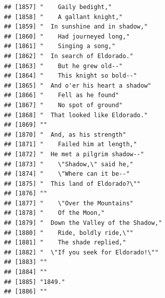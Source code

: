 \documentclass{article}\usepackage[]{graphicx}\usepackage[]{color}
\makeatletter
\newenvironment{kframe}{%
 \def\at@end@of@kframe{}%
 \ifinner\ifhmode%
  \def\at@end@of@kframe{\end{minipage}}%
  \begin{minipage}{\columnwidth}%
 \fi\fi%
 \def\FrameCommand##1{\hskip\@totalleftmargin \hskip-\fboxsep
 \colorbox{shadecolor}{##1}\hskip-\fboxsep
     \hskip-\linewidth \hskip-\@totalleftmargin \hskip\columnwidth}%
 \MakeFramed {\advance\hsize-\width
   \@totalleftmargin\z@ \linewidth\hsize
   \@setminipage}}%
 {\par\unskip\endMakeFramed%
 \at@end@of@kframe}
\newenvironment{knitrout}{}{} %
\makeatother
\begin{document}
\begin{knitrout}
\begin{kframe}
\begin{verbatim}
## [1857] "    Gaily bedight,"                                                          
## [1858] "    A gallant knight,"                                                       
## [1859] "  In sunshine and in shadow,"                                                
## [1860] "    Had journeyed long,"                                                     
## [1861] "    Singing a song,"                                                         
## [1862] "  In search of Eldorado."                                                    
## [1863] "    But he grew old--"                                                       
## [1864] "    This knight so bold--"                                                   
## [1865] "  And o'er his heart a shadow"                                               
## [1866] "    Fell as he found"                                                        
## [1867] "    No spot of ground"                                                       
## [1868] "  That looked like Eldorado."                                                
## [1869] ""                                                                            
## [1870] "  And, as his strength"                                                      
## [1871] "    Failed him at length,"                                                   
## [1872] "  He met a pilgrim shadow--"                                                 
## [1873] "    \"Shadow,\" said he,"                                                    
## [1874] "    \"Where can it be--"                                                     
## [1875] "  This land of Eldorado?\""                                                  
## [1876] ""                                                                            
## [1877] "    \"Over the Mountains"                                                    
## [1878] "    Of the Moon,"                                                            
## [1879] "  Down the Valley of the Shadow,"                                            
## [1880] "    Ride, boldly ride,\""                                                    
## [1881] "    The shade replied,"                                                      
## [1882] "  \"If you seek for Eldorado!\""                                             
## [1883] ""                                                                            
## [1884] ""                                                                            
## [1885] "1849."                                                                       
## [1886] ""                                                                            

\end{verbatim}
\end{kframe}
\end{knitrout}
\end{document}
